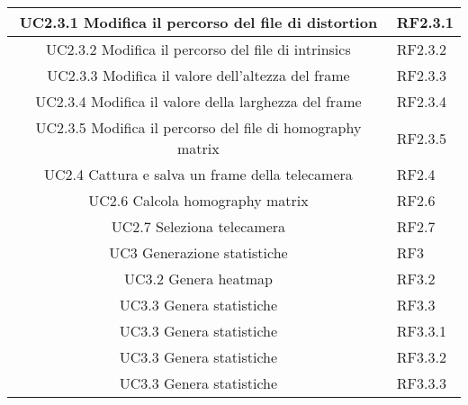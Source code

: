 \begin{center}
{\begin{longtable}{ | c | p{1.5cm} |}
UC2.3.1 Modifica il percorso del file di distortion & RF2.3.1 \\ \hline 
UC2.3.2 Modifica il percorso del file di intrinsics & RF2.3.2 \\ \hline 
UC2.3.3 Modifica il valore dell'altezza del frame & RF2.3.3 \\ \hline 
UC2.3.4 Modifica il valore della larghezza del frame & RF2.3.4 \\ \hline 
UC2.3.5 Modifica il percorso del file di homography matrix & RF2.3.5 \\ \hline 
UC2.4 Cattura e salva un frame della telecamera & RF2.4 \\ \hline 
UC2.6 Calcola homography matrix & RF2.6 \\ \hline 
UC2.7 Seleziona telecamera & RF2.7 \\ \hline 
UC3 Generazione statistiche & RF3 \\ \hline 
UC3.2 Genera heatmap & RF3.2 \\ \hline 
UC3.3 Genera statistiche & RF3.3 \\ \hline 
UC3.3 Genera statistiche & RF3.3.1 \\ \hline 
UC3.3 Genera statistiche & RF3.3.2 \\ \hline 
UC3.3 Genera statistiche & RF3.3.3 \\ \hline 
\end{longtable} }
\end{center} 
